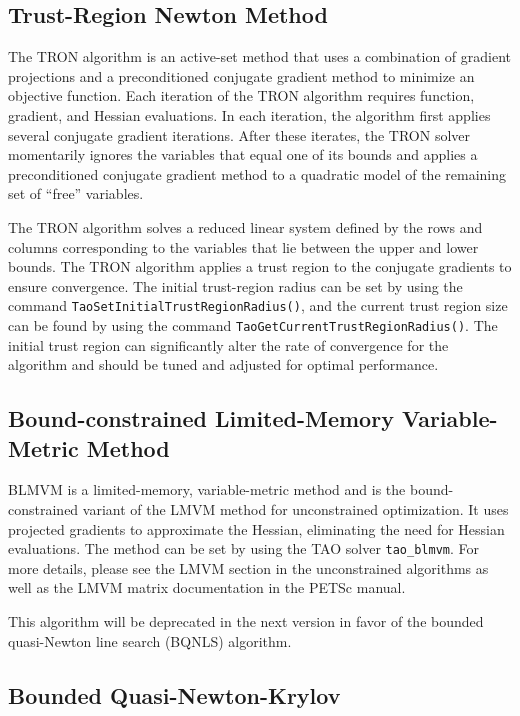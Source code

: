 \subsection{Trust-Region Newton Method}\label{sec:tron}
The TRON \cite{lin_c3} algorithm is an active-set method that uses a 
combination of gradient projections and 
a preconditioned conjugate gradient method to minimize an objective function.
Each iteration of the TRON algorithm requires function, gradient, 
and Hessian evaluations.  In each iteration, the algorithm
first applies several conjugate gradient iterations.  
After these iterates, the TRON solver momentarily ignores the variables
that equal one of its bounds and
applies a preconditioned conjugate gradient method to a
quadratic model of the remaining set of ``free'' variables.  

The TRON algorithm solves a reduced linear system
defined by the rows and columns corresponding to the variables that
lie between the upper and lower bounds.
The TRON algorithm applies a trust region to the 
conjugate gradients to ensure convergence.  The initial trust-region
radius
can be set by using the command 
{\tt Tao\-Set\-Initial\-Trust\-Region\-Radius()},
and the current trust region size can be found by using the command
{\tt Tao\-Get\-Current\-Trust\-Region\-Radius()}.
The initial trust region can significantly alter the 
rate of convergence for the algorithm and should be
tuned and adjusted for optimal performance.

\subsection{Bound-constrained Limited-Memory Variable-Metric Method}
\label{sec:blmvm}

BLMVM is a limited-memory, variable-metric method and is 
the bound-constrained variant of the LMVM method for
unconstrained optimization. It uses projected gradients to approximate
the Hessian, eliminating the need for Hessian evaluations.
The method can be set by using the TAO solver {\tt tao\_blmvm}. For more details, 
please see the LMVM section in the unconstrained algorithms as well as the 
LMVM matrix documentation in the PETSc manual.

This algorithm will be deprecated in the next version in favor of the bounded quasi-Newton 
line search (BQNLS) algorithm.

\subsection{Bounded Quasi-Newton-Krylov}\label{sec:bqnk}

